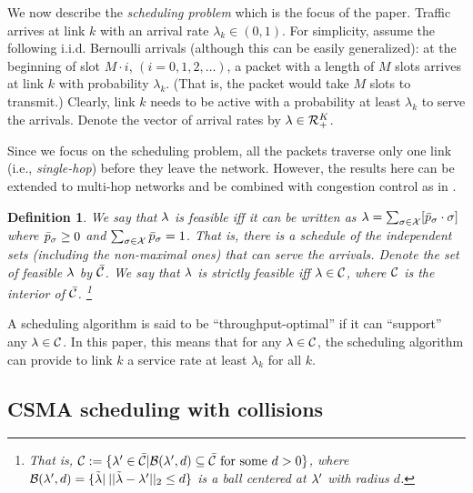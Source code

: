 \documentclass{IEEEtran}
\newtheorem{definitn}{Definition}
\begin{document}
We now describe the \emph{scheduling problem} which is the focus of
the paper. Traffic arrives at link $k$ with an arrival rate $\lambda_{k}\in(0,1)$.
For simplicity, assume the following i.i.d. Bernoulli arrivals (although
this can be easily generalized): at the beginning of slot $M\cdot i$,
$(i=0,1,2,\dots)$, a packet with a length of $M$ slots arrives at
link $k$ with probability $\lambda_{k}$. (That is, the packet would
take $M$ slots to transmit.) Clearly, link $k$ needs to be active
with a probability at least $\lambda_{k}$ to serve the arrivals.
Denote the vector of arrival rates by ${\bf \lambda}\in{\cal R}_{+}^{K}$. 

Since we focus on the scheduling problem, all the packets traverse
only one link (i.e., \emph{single-hop}) before they leave the network.
However, the results here can be extended to multi-hop networks and
be combined with congestion control as in \cite{Allerton}.
\begin{definitn}
\label{def:feasible}We say that ${\bf \lambda}$ is\emph{ feasible}
iff it can be written as ${\bf \lambda}=\sum_{{\bf \sigma}\in{\cal X}}[\bar{p}_{{\bf \sigma}}\cdot{\bf \sigma}]$
where $\bar{p}_{{\bf \sigma}}\ge0$ and $\sum_{{\bf \sigma}\in{\cal X}}\bar{p}_{{\bf \sigma}}=1$.
That is, there is a schedule of the independent sets (including the
non-maximal ones) that can serve the arrivals. Denote the set of feasible
${\bf \lambda}$ by $\bar{{\cal C}}$. We say that ${\bf \lambda}$
is \emph{strictly feasible} iff $\lambda\in{\cal C}$, where ${\cal C}$
is the interior of $\bar{{\cal C}}$. \footnote{That is, ${\cal C}:=\{{\bf \lambda}'\in\bar{{\cal C}}|{\cal B}({\bf \lambda}',d)\subseteq\bar{{\cal C}}\text{ for some }d>0\}$,
where ${\cal B}({\bf \lambda}',d)=\{\tilde{{\bf \lambda}}|\:||\tilde{{\bf \lambda}}-{\bf \lambda}'||_{2}\le d\}$
is a ball centered at ${\bf \lambda}'$ with radius $d$.}
\end{definitn}
A scheduling algorithm is said to be {}``throughput-optimal'' if
it can {}``support'' any $\lambda\in{\cal C}$. In this paper, this
means that for any ${\bf \lambda}\in{\cal C}$, the scheduling algorithm
can provide to link $k$ a service rate at least $\lambda_{k}$ for
all $k$.


\subsection{CSMA scheduling with collisions}
\end{document}

